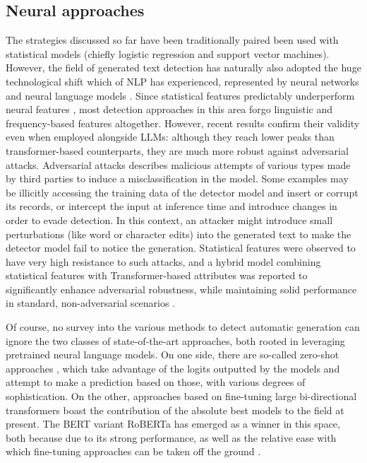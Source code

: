 \subsection{Neural approaches}

The strategies discussed so far have been traditionally paired been used with statistical models (chiefly logistic regression and support vector machines).
However, the field of generated text detection has naturally also adopted the huge technological shift which of NLP has experienced, represented by neural networks and neural language models \citep{papers2024nlp}.
Since statistical features predictably underperform neural features \citep{crothers2022adversarial}, most detection approaches in this area forgo linguistic and frequency-based features altogether.
However, recent results confirm their validity even when employed alongside LLMs: although they reach lower peaks than transformer-based counterparts, they are much more robust against adversarial attacks.
Adversarial attacks describes malicious attempts of various types made by third parties to induce a misclassification in the model.
Some examples may be illicitly accessing the training data of the detector model and insert or corrupt its records, or intercept the input at inference time and introduce changes in order to evade detection.
In this context, an attacker might introduce small perturbations (like word or character edits) into the generated text to make the detector model fail to notice the generation.
Statistical features were observed to have very high resistance to such attacks, and a hybrid model combining statistical features with Transformer-based attributes was reported to significantly enhance adversarial robustness, while maintaining solid performance in standard, non-adversarial scenarios \citep{crothers2022adversarial}.

Of course, no survey into the various methods to detect automatic generation can ignore the two classes of state-of-the-art approaches, both rooted in leveraging pretrained neural language models.
On one side, there are so-called zero-shot approaches \citep{zellers2020defendingneuralfakenews}, which take advantage of the logits outputted by the models and attempt to make a prediction based on those, with various degrees of sophistication.
On the other, approaches based on fine-tuning large bi-directional transformers \citep{solaiman2019release} boast the contribution of the absolute best models to the field at present.
The BERT variant RoBERTa \citep{liu2019robertarobustlyoptimizedbert} has emerged as a winner in this space, both because due to its strong performance, as well as the relative ease with which fine-tuning approaches can be taken off the ground \citep{radford2019dataset}.

